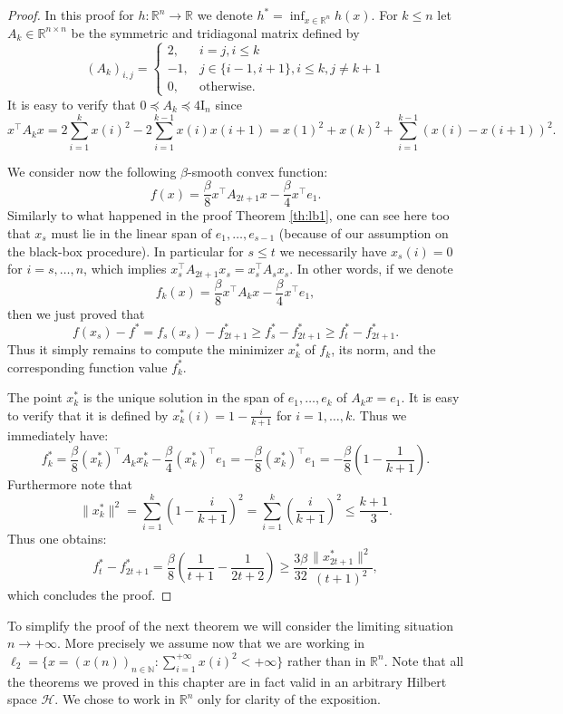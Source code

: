 \documentclass[openany]{now}
\newcommand{\mI}{\mathrm{I}}
\newcommand{\R}{\mathbb{R}}
\begin{document}
\begin{proof} In this proof for $h: \R^n \rightarrow \R$ we denote $h^* = \inf_{x \in \R^n} h(x)$.
For $k \leq n$ let $A_k \in \R^{n \times n}$ be the symmetric and tridiagonal matrix defined by
$$(A_k)_{i,j}  = \left\{\begin{array}{ll} 
2, & i = j, i \leq k \\
-1, & j \in \{i-1, i+1\}, i \leq k, j \neq k+1\\
0, & \text{otherwise}.
\end{array}\right.$$
It is easy to verify that $0 \preceq A_k \preceq 4 \mI_n$ since
$$x^{\top} A_k x = 2 \sum_{i=1}^k x(i)^2 - 2 \sum_{i=1}^{k-1} x(i) x(i+1) = x(1)^2 + x(k)^2 + \sum_{i=1}^{k-1} (x(i) - x(i+1))^2 .$$

We consider now the following $\beta$-smooth convex function:
$$f(x) = \frac{\beta}{8} x^{\top} A_{2 t + 1} x - \frac{\beta}{4} x^{\top} e_1 .$$
Similarly to what happened in the proof Theorem \ref{th:lb1}, one can see here too that $x_s$ must lie in the linear span of $e_1, \hdots, e_{s-1}$ (because of our assumption on the black-box procedure). In particular for $s \leq t$ we necessarily have $x_s(i) = 0$ for $i=s, \hdots, n$, which implies $x_s^{\top} A_{2 t+1} x_s = x_s^{\top} A_{s} x_s$. In other words, if we denote
$$f_k(x) = \frac{\beta}{8} x^{\top} A_{k} x - \frac{\beta}{4} x^{\top} e_1 ,$$
then we just proved that
$$f(x_s) - f^* = f_s(x_s) - f_{2t+1}^* \geq f_{s}^* - f_{2 t + 1}^* \geq f_{t}^* - f_{2 t + 1}^* .$$
Thus it simply remains to compute the minimizer $x^*_k$ of $f_k$, its norm, and the corresponding function value $f_k^*$.

The point $x^*_k$ is the unique solution in the span of $e_1, \hdots, e_k$ of $A_k x = e_1$. It is easy to verify that it is defined by $x^*_k(i) = 1 - \frac{i}{k+1}$ for $i=1, \hdots, k$. Thus we immediately have:
$$f^*_k = \frac{\beta}{8} (x^*_k)^{\top} A_{k} x^*_k - \frac{\beta}{4} (x^*_k)^{\top} e_1 = - \frac{\beta}{8} (x^*_k)^{\top} e_1 = - \frac{\beta}{8} \left(1 - \frac{1}{k+1}\right) .$$
Furthermore note that
$$\|x^*_k\|^2 = \sum_{i=1}^k \left(1 - \frac{i}{k+1}\right)^2 = \sum_{i=1}^k \left( \frac{i}{k+1}\right)^2 \leq \frac{k+1}{3} .$$
Thus one obtains:
$$f_{t}^* - f_{2 t+1}^* = \frac{\beta}{8} \left(\frac{1}{t+1} - \frac{1}{2 t + 2} \right) \geq \frac{3 \beta}{32} \frac{\|x^*_{2 t + 1}\|^2}{(t+1)^2},$$
which concludes the proof.
\end{proof}

To simplify the proof of the next theorem we will consider the limiting situation $n \to +\infty$. More precisely we assume now that we are working in $\ell_2 = \{ x = (x(n))_{n \in \mathbb{N}} : \sum_{i=1}^{+\infty} x(i)^2 < + \infty\}$ rather than in $\mathbb{R}^n$. Note that all the theorems we proved in this chapter are in fact valid in an arbitrary Hilbert space $\mathcal{H}$. We chose to work in $\mathbb{R}^n$ only for clarity of the exposition.
\end{document}
